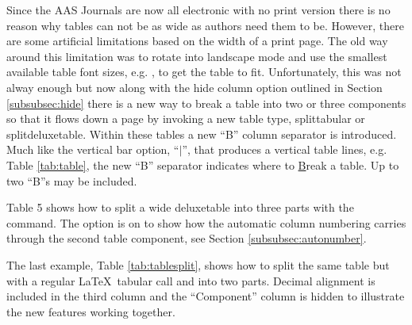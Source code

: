 \documentclass[preprint]{aastex62}
\newcommand\latex{La\TeX}
\begin{document}
Since the AAS Journals are now all electronic with no print version there is
no reason why tables can not be as wide as authors need them to be.
However, there are some artificial limitations based on the width of a
print page.  The old way around this limitation was to rotate into 
landscape mode and use the smallest available table font
sizes, e.g. {\tt\string\tablewidth}, to get the table to fit.
Unfortunately, this was not alway enough but now along with the hide column
option outlined in Section \ref{subsubsec:hide} there is a new way to break
a table into two or three components so that it flows down a page by
invoking a new table type, splittabular or splitdeluxetable. Within these
tables a new ``B'' column separator is introduced.  Much like the vertical
bar option, ``$\vert$'', that produces a vertical table lines, e.g. Table
\ref{tab:table}, the new ``B'' separator indicates where to \underline{B}reak
a table.  Up to two ``B''s may be included.

Table 5 %
shows how to split a wide deluxetable into three parts with
the {\tt\string\splitdeluxetable} command.  The {\tt\string\colnumbers}
option is on to show how the automatic column numbering carries through the
second table component, see Section \ref{subsubsec:autonumber}.

The last example, Table \ref{tab:tablesplit}, shows how to split the same
table but with a regular \latex\ tabular call and into two parts. Decimal
alignment is included in the third column and the ``Component'' column is
hidden to illustrate the new features working together.
\end{document}

